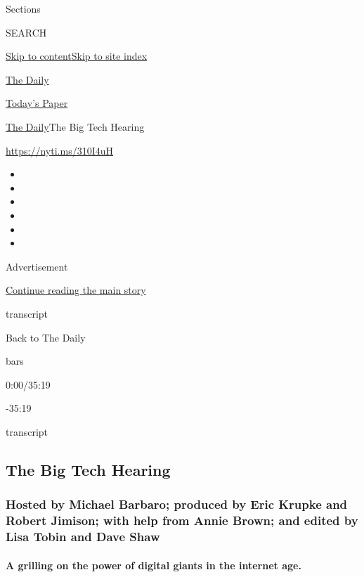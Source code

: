 Sections

SEARCH

\protect\hyperlink{site-content}{Skip to
content}\protect\hyperlink{site-index}{Skip to site index}

\href{https://www.nytimes.com/podcasts/the-daily}{The Daily}

\href{https://myaccount.nytimes.com/auth/login?response_type=cookie\&client_id=vi}{}

\href{https://www.nytimes.com/section/todayspaper}{Today's Paper}

\href{/podcasts/the-daily}{The Daily}\textbar{}The Big Tech Hearing

\url{https://nyti.ms/310I4uH}

\begin{itemize}
\item
\item
\item
\item
\item
\item
\end{itemize}

Advertisement

\protect\hyperlink{after-top}{Continue reading the main story}

transcript

Back to The Daily

bars

0:00/35:19

-35:19

transcript

\hypertarget{the-big-tech-hearing}{%
\subsection{The Big Tech Hearing}\label{the-big-tech-hearing}}

\hypertarget{hosted-by-michael-barbaro-produced-by-eric-krupke-and-robert-jimison-with-help-from-annie-brown-and-edited-by-lisa-tobin-and-dave-shaw}{%
\subsubsection{Hosted by Michael Barbaro; produced by Eric Krupke and
Robert Jimison; with help from Annie Brown; and edited by Lisa Tobin and
Dave
Shaw}\label{hosted-by-michael-barbaro-produced-by-eric-krupke-and-robert-jimison-with-help-from-annie-brown-and-edited-by-lisa-tobin-and-dave-shaw}}

\hypertarget{a-grilling-on-the-power-of-digital-giants-in-the-internet-age}{%
\paragraph{A grilling on the power of digital giants in the internet
age.}\label{a-grilling-on-the-power-of-digital-giants-in-the-internet-age}}

